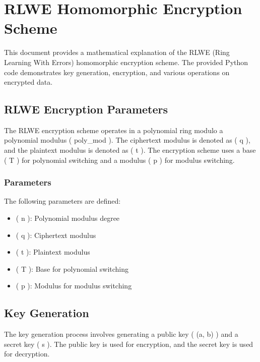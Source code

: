\hypertarget{rlwe-homomorphic-encryption-scheme}{%
\section{RLWE Homomorphic Encryption
Scheme}\label{rlwe-homomorphic-encryption-scheme}}

This document provides a mathematical explanation of the RLWE (Ring
Learning With Errors) homomorphic encryption scheme. The provided Python
code demonstrates key generation, encryption, and various operations on
encrypted data.

\hypertarget{rlwe-encryption-parameters}{%
\subsection{RLWE Encryption
Parameters}\label{rlwe-encryption-parameters}}

The RLWE encryption scheme operates in a polynomial ring modulo a
polynomial modulus ( poly\_mod ). The ciphertext modulus is denoted as (
q ), and the plaintext modulus is denoted as ( t ). The encryption
scheme uses a base ( T ) for polynomial switching and a modulus ( p )
for modulus switching.

\hypertarget{parameters}{%
\subsubsection{Parameters}\label{parameters}}

The following parameters are defined:

\begin{itemize}
\tightlist
\item
  ( n ): Polynomial modulus degree
\item
  ( q ): Ciphertext modulus
\item
  ( t ): Plaintext modulus
\item
  ( T ): Base for polynomial switching
\item
  ( p ): Modulus for modulus switching
\end{itemize}

\hypertarget{key-generation}{%
\subsection{Key Generation}\label{key-generation}}

The key generation process involves generating a public key ( (a, b) )
and a secret key ( s ). The public key is used for encryption, and the
secret key is used for decryption.

